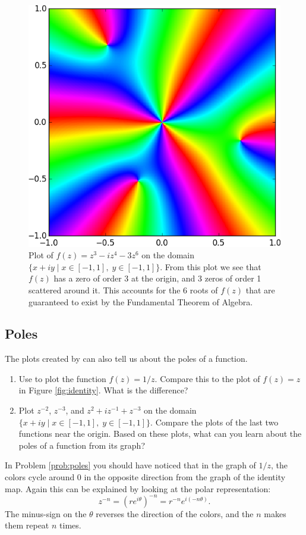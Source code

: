 \begin{figure}
\includegraphics[width=.7\textwidth]{zeros.png}
\caption{Plot of $f(z)=z^3 - iz^4 - 3z^6$ on the domain $\{x+iy \mid x \in [-1,1] , \; y \in [-1,1]\}$.
From this plot we see that $f(z)$ has a zero of order 3 at the origin, and 3 zeros of order 1 scattered around it. 
This accounts for the 6 roots of $f(z)$ that are guaranteed to exist by the Fundamental Theorem of Algebra.}
\label{fig:zeros}
\end{figure}


\subsection*{Poles}

The plots created by  can also tell us about the poles of a function.

\begin{problem}\label{prob:poles}
\leavevmode
\begin{enumerate}
\item Use  to plot the function $f(z) = 1/z$. 
Compare this to the plot of $f(z)=z$ in Figure \ref{fig:identity}.
What is the difference?
\item Plot $z^{-2}$, $z^{-3}$, and $z^2+iz^{-1}+z^{-3}$ on the domain $\{x+iy \mid x \in [-1,1] , \; y \in [-1,1]\}$. 
Compare the plots of the last two functions near the origin.
Based on these plots, what can you learn about the poles of a function from its graph?
\end{enumerate}
\end{problem}

In Problem \ref{prob:poles} you should have noticed that in the graph of $1/z$, the colors cycle around 0 in the opposite direction from the graph of the identity map.
Again this can be explained by looking at the polar representation:
\[
z^{-n} = (re^{i \theta})^{-n} = r^{-n} e^{i(-n\theta)}.
\]
The minus-sign on the $\theta$ reverses the direction of the colors, and the $n$ makes them repeat $n$ times.

